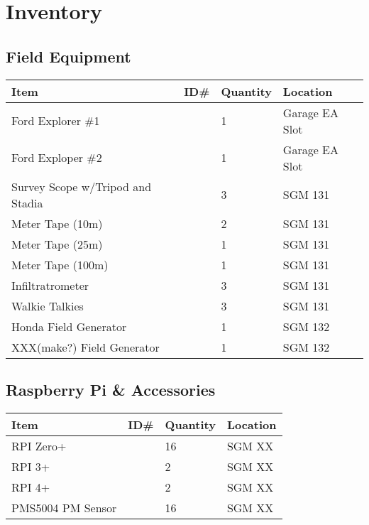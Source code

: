 \documentclass[12pt]{../SOP4_alpha}\usepackage[]{graphicx}\usepackage[]{color}
\begin{document}


\section{Inventory}

\subsection{Field Equipment}

\begin{tabular}{|l|l|l|l|}
\hline
Item      & ID\#  & Quantity & Location \\ \hline
Ford Explorer \#1 && 1 & Garage EA Slot \\
Ford Exploper \#2  && 1 & Garage EA Slot \\
Survey Scope w/Tripod and Stadia  && 3 & SGM 131 \\
Meter Tape (10m)  && 2 & SGM 131 \\
Meter Tape (25m)  && 1 & SGM 131 \\
Meter Tape (100m) && 1 & SGM 131 \\
Infiltratrometer  && 3 & SGM 131 \\
Walkie Talkies && 3 & SGM 131 \\
Honda Field Generator  && 1 & SGM 132 \\
XXX(make?) Field Generator && 1 & SGM 132 \\
\hline
\end{tabular}

\subsection{Raspberry Pi \& Accessories}

\begin{tabular}{|l|l|l|l|}
\hline
Item      & ID\#  & Quantity & Location \\ \hline
RPI Zero+  && 16 & SGM XX \\
RPI 3+  && 2 & SGM XX \\
RPI 4+ && 2 & SGM XX \\
PMS5004 PM Sensor && 16 & SGM XX \\
\hline
\end{tabular}
\end{document}
